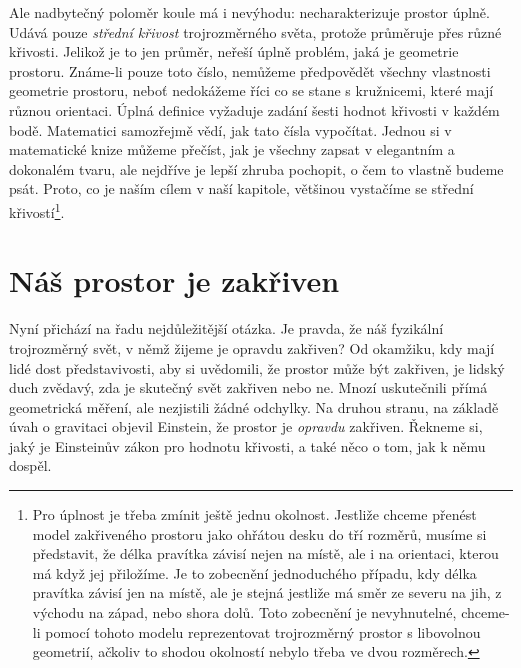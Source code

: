     Ale nadbytečný poloměr koule má i nevýhodu: necharakterizuje prostor úplně. Udává pouze 
    \emph{střední křivost} trojrozměrného světa, protože průměruje přes různé křivosti. Jelikož je 
    to jen průměr, neřeší úplně problém, jaká je geometrie prostoru. Známe-li pouze toto číslo, 
    nemůžeme předpovědět všechny vlastnosti geometrie prostoru, neboť nedokážeme říci co se stane s 
    kružnicemi, které mají různou orientaci. Úplná definice vyžaduje zadání šesti hodnot křivosti v 
    každém bodě. Matematici samozřejmě vědí, jak tato čísla vypočítat. Jednou si v matematické 
    knize můžeme přečíst, jak je všechny zapsat v elegantním a dokonalém tvaru, ale nejdříve je 
    lepší zhruba pochopit, o čem to vlastně budeme psát. Proto, co je naším cílem v naší kapitole, 
    většinou vystačíme se střední křivostí\footnote{Pro úplnost je třeba zmínit ještě jednu 
    okolnost. Jestliže chceme přenést model zakřiveného prostoru jako ohřátou desku do tří rozměrů, 
    musíme si představit, že délka pravítka závisí nejen na místě, ale i na orientaci, kterou má 
    když jej přiložíme. Je to zobecnění jednoduchého případu, kdy délka pravítka závisí jen na 
    místě, ale je stejná jestliže má směr ze severu na jih, z východu na západ, nebo shora dolů. 
    Toto zobecnění je nevyhnutelné, chceme-li pomocí tohoto modelu reprezentovat trojrozměrný 
    prostor s libovolnou geometrií, ačkoliv to shodou okolností nebylo třeba ve dvou rozměrech.}.

  \section{Náš prostor je zakřiven}\label{fyz:IIchapXLIIsecIII}
    Nyní přichází na řadu nejdůležitější otázka. Je pravda, že náš fyzikální trojrozměrný svět, v 
    němž žijeme je opravdu zakřiven? Od okamžiku, kdy mají lidé dost představivosti, aby si 
    uvědomili, že prostor může být zakřiven, je lidský duch zvědavý, zda je skutečný svět zakřiven 
    nebo ne. Mnozí uskutečnili přímá geometrická měření, ale nezjistili žádné odchylky. Na druhou 
    stranu, na základě úvah o gravitaci objevil Einstein, že prostor je \emph{opravdu} zakřiven. 
    Řekneme si, jaký je Einsteinův zákon pro hodnotu křivosti, a také něco o tom, jak k němu dospěl.
    
